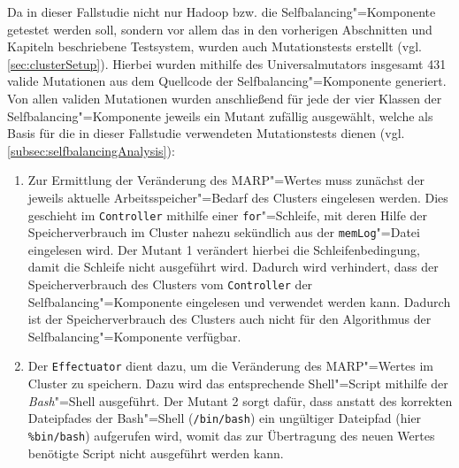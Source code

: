 Da in dieser Fallstudie nicht nur Hadoop bzw. die Selfbalancing"=Komponente getestet werden soll, sondern vor allem das in den vorherigen Abschnitten und Kapiteln beschriebene Testsystem, wurden auch Mutationstests erstellt (vgl. \cref{sec:clusterSetup}).
Hierbei wurden mithilfe des Universalmutators insgesamt 431 valide Mutationen aus dem Quellcode der Selfbalancing"=Komponente generiert.
Von allen validen Mutationen wurden anschließend für jede der vier Klassen der Selfbalancing"=Komponente jeweils ein Mutant zufällig ausgewählt, welche als Basis für die in dieser Fallstudie verwendeten Mutationstests dienen (vgl. \cref{subsec:selfbalancingAnalysis}):

\begin{enumerate}[itemsep=5pt]
    \item
    Zur Ermittlung der Veränderung des \gls{MARP}"=Wertes muss zunächst der jeweils aktuelle Arbeitsspeicher"=Bedarf des Clusters eingelesen werden.
    Dies geschieht im \texttt{Controller} mithilfe einer \texttt{for}"=Schleife, mit deren Hilfe der Speicherverbrauch im Cluster nahezu sekündlich aus der \texttt{memLog}"=Datei eingelesen wird.
    Der Mutant 1 verändert hierbei die Schleifenbedingung, damit die Schleife nicht ausgeführt wird.
    Dadurch wird verhindert, dass der Speicherverbrauch des Clusters vom \texttt{Controller} der Selfbalancing"=Komponente eingelesen und verwendet werden kann.
    Dadurch ist der Speicherverbrauch des Clusters auch nicht für den Algorithmus \cite{Zhang2016} der Selfbalancing"=Komponente verfügbar.
    
    \item 
    Der \texttt{Effectuator} dient dazu, um die Veränderung des \gls{MARP}"=Wertes im Cluster zu speichern.
    Dazu wird das entsprechende Shell"=Script mithilfe der \emph{Bash}"=Shell ausgeführt.
    Der Mutant 2 sorgt dafür, dass anstatt des korrekten Dateipfades der Bash"=Shell (\texttt{/bin/bash}) ein ungültiger Dateipfad (hier \texttt{\%bin/bash}) aufgerufen wird, womit das zur Übertragung des neuen Wertes benötigte Script nicht ausgeführt werden kann.
    

\end{enumerate}
